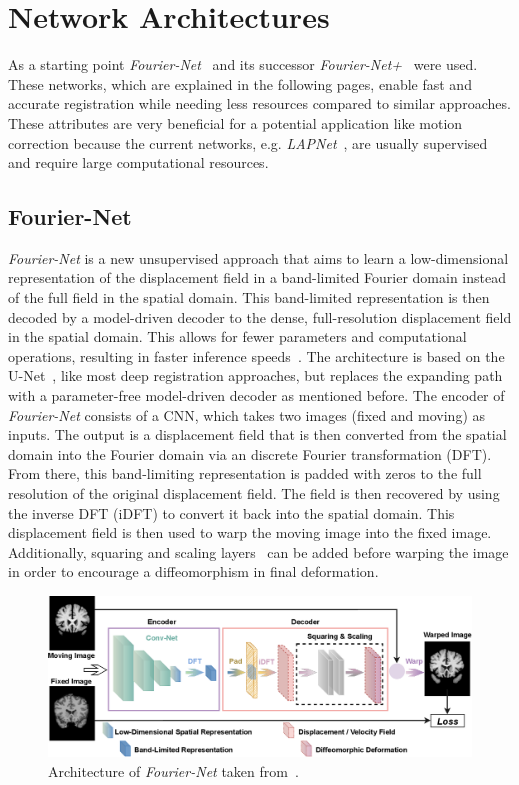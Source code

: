 \documentclass[english,version-2022-01]{uzl-thesis} %
\begin{document}
\chapter{Network Architectures} \label{Ch:NetworkArchitecture}
As a starting point \emph{Fourier-Net}~\cite{Fourier-Net} and its successor \emph{Fourier-Net+}~\cite{Fourier-Net+} were used. These networks, which are explained in the following pages, enable fast and accurate registration while needing less resources compared to similar approaches. These attributes are very beneficial for a potential application like motion correction because the current networks, e.g. \emph{LAPNet}~\cite{LAPNet}, are usually supervised and require large computational resources.

\section{Fourier-Net}	\label{Sec:Fourier-Net}
\emph{Fourier-Net} is a new unsupervised approach that aims to learn a low-dimensional representation of the displacement field in a band-limited Fourier domain instead of the full field in the spatial domain. This band-limited representation is then decoded by a model-driven decoder to the dense, full-resolution displacement field in the spatial domain. This allows for fewer parameters and computational operations, resulting in faster inference speeds~\cite{Fourier-Net}. The architecture is based on the U-Net~\cite{U-Net}, like most deep registration approaches, but replaces the expanding path with a parameter-free model-driven decoder as mentioned before. The encoder of \emph{Fourier-Net} consists of a CNN, which takes two images (fixed and moving) as inputs. The output is a displacement field that is then converted from the spatial domain into the Fourier domain via an discrete Fourier transformation (DFT). From there, this band-limiting representation 
is padded with zeros to the full resolution of the original displacement field. The field is then recovered by using the inverse DFT (iDFT) to convert it back into the spatial domain. This displacement field is then used to warp the moving image into the fixed image. Additionally, squaring and scaling layers~\cite{Dalca2018} can be added before warping the image in order to encourage a diffeomorphism in final deformation. 

\begin{figure}[htpb]
	\centering
	\graphicspath{{images/}{\main/images/}}
	\includegraphics[width=\linewidth]{ArchitectureFourier-Net.png} 
	\caption{Architecture of \emph{Fourier-Net} taken from~\cite{Fourier-Net}.}
	\label{fig:Fourier-Net}
\end{figure}
\end{document}
